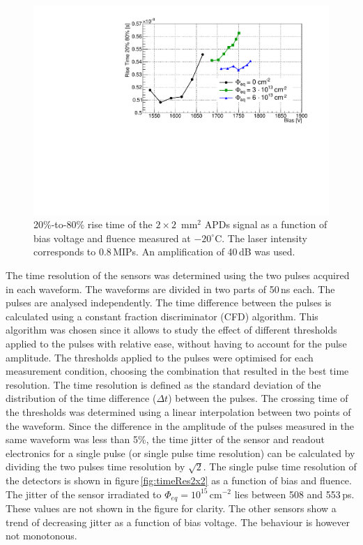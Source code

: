 \documentclass[review,number,sort&compress]{elsarticle}
\begin{document}
\begin{figure}
  \centering
  \includegraphics[width = 0.6 \columnwidth]{riseTime2x2APDsNo1e15}
  \caption{20\%-to-80\% rise time of the $2 \times 2$~mm$^2$ APDs signal as a function of bias voltage and fluence measured at $-20^\circ$C. The laser intensity corresponds to 0.8\,MIPs. An amplification of 40\,dB was used.}
  \label{fig:riseTime2x2}
\end{figure}

The time resolution of the sensors was determined using the two pulses acquired in each waveform.
The waveforms are divided in two parts of 50\,ns each.
The pulses are analysed independently.
The time difference between the pulses is calculated using a constant fraction discriminator (CFD) algorithm.
This algorithm was chosen since it allows to study the effect of different thresholds applied to the pulses with relative ease, without having to account for the pulse amplitude.
The thresholds applied to the pulses were optimised for each measurement condition, choosing the combination that resulted in the best time resolution.
The time resolution is defined as the standard deviation of the distribution of the time difference ($\Delta t$) between the pulses.
The crossing time of the thresholds was determined using a linear interpolation between two points of the waveform.
Since the difference in the amplitude of the pulses measured in the same waveform was less than 5\%, the time jitter of the sensor and readout electronics for a single pulse (or single pulse time resolution) can be calculated by dividing the two pulses time resolution by $\sqrt{2}$.
The single pulse time resolution of the detectors is shown in figure\,\ref{fig:timeRes2x2} as a function of bias and fluence.
The jitter of the sensor irradiated to $\Phi_{eq} = 10^{15}$\,cm$^{-2}$ lies between 508 and 553\,ps.
These values are not shown in the figure for clarity.
The other sensors show a trend of decreasing jitter as a function of bias voltage.
The behaviour is however not monotonous.
\end{document}
